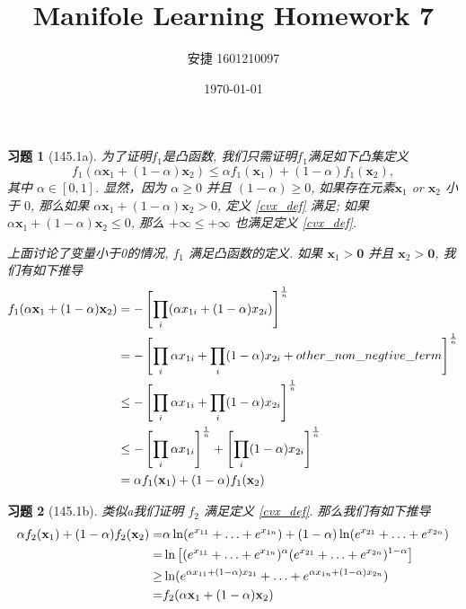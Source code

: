 \documentclass[a4paper, UTF8]{ctexart}
\title{Manifole Learning Homework 7}
\date{\today}
\author{安捷 1601210097}
\newtheorem*{exercise}{\textbf{习题}}
\begin{document}
\maketitle
	\begin{exercise}[145.1a]
		为了证明$f_1$是凸函数, 我们只需证明$f_1$满足如下凸集定义 
		\begin{equation} \label{cvx_def}
		f_1(\alpha \mathbf{x}_1 + (1 - \alpha) \mathbf{x}_2) \leq \alpha f_1(\mathbf{x}_1) + (1 - \alpha) f_1(\mathbf{x}_2),
		\end{equation}
		其中 $\alpha \in [0, 1] $. 显然，因为 $\alpha \geq 0$ 并且 $(1 - \alpha) \geq 0$, 如果存在元素$\mathbf{x}_1$ or $\mathbf{x}_2$ 小于 $0$, 那么如果 $\alpha \mathbf{x}_1 + (1 - \alpha) \mathbf{x}_2 > 0$, 定义 \ref{cvx_def} 满足; 如果 $\alpha \mathbf{x}_1 + (1 - \alpha) \mathbf{x}_2 \leq 0$, 那么 $+\infty \leq +\infty$ 也满足定义 \ref{cvx_def}.

		上面讨论了变量小于0的情况, $f_1$ 满足凸函数的定义. 如果 $\mathbf{x}_1 > \mathbf{0}$ 并且 $\mathbf{x}_2 > \mathbf{0}$, 我们有如下推导
		\begin{equation}
		\notag
		\begin{split}
		f_1(\alpha \mathbf{x}_1 + (1 - \alpha) \mathbf{x}_2) & = -\left[\prod_i (\alpha x_{1i} + (1 - \alpha) x_{2i})\right]^{\frac{1}{n}} \\
		& = -\left[\prod_i \alpha x_{1i} + \prod_i (1 - \alpha) x_{2i} + other\_non\_negtive\_term \right]^{\frac{1}{n}} \\
		& \leq -\left[\prod_i \alpha x_{1i} + \prod_i (1 - \alpha) x_{2i}\right]^{\frac{1}{n}} \\
		& \leq -\left[\prod_i \alpha x_{1i}\right]^{\frac{1}{n}} + \left[\prod_i (1 - \alpha) x_{2i}\right]^{\frac{1}{n}} \\
		& = \alpha f_1(\mathbf{x}_1) + (1 - \alpha) f_1(\mathbf{x}_2)
		\end{split}
		\end{equation}
	\end{exercise}

	\begin{exercise}[145.1b]
		类似a我们证明 $f_2$ 满足定义 \ref{cvx_def}. 那么我们有如下推导
		\begin{equation}
		\notag
		\begin{split}
		\alpha f_2(\mathbf{x}_1) + (1 - \alpha) f_2(\mathbf{x}_2) = & \alpha \ln(e^{x_{11}} + \ldots + e^{x_{1n}}) + (1 - \alpha) \ln(e^{x_{21}} + \ldots + e^{x_{2n}}) \\
		= & \ln \left[(e^{x_{11}} + \ldots + e^{x_{1n}})^\alpha (e^{x_{21}} + \ldots + e^{x_{2n}})^{1 - \alpha}\right] \\
		\ge & \ln(e^{\alpha x_{11} + (1 - \alpha) x_{21}} + \ldots + e^{\alpha x_{1n} + (1 - \alpha) x_{2n}}) \\
		= & f_2(\alpha \mathbf{x}_1 + (1 - \alpha) \mathbf{x}_2)
		\end{split}
		\end{equation}
	\end{exercise}
\end{document}

